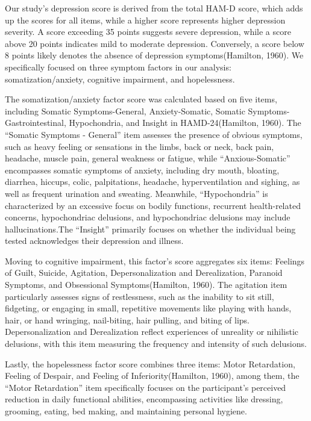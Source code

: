 \documentclass[
  man,floatsintext]{apa6}
\begin{document}
Our study's depression score is derived from the total HAM-D score, which adds up the scores for all items, while a higher score represents higher depression severity. A score exceeding 35 points suggests severe depression, while a score above 20 points indicates mild to moderate depression. Conversely, a score below 8 points likely denotes the absence of depression symptoms(Hamilton, 1960). We specifically focused on three symptom factors in our analysis: somatization/anxiety, cognitive impairment, and hopelessness.

The somatization/anxiety factor score was calculated based on five items, including Somatic Symptoms-General, Anxiety-Somatic, Somatic Symptoms-Gastrointestinal, Hypochondria, and Insight in HAMD-24(Hamilton, 1960). The ``Somatic Symptoms - General'' item assesses the presence of obvious symptoms, such as heavy feeling or sensations in the limbs, back or neck, back pain, headache, muscle pain, general weakness or fatigue, while ``Anxious-Somatic'' encompasses somatic symptoms of anxiety, including dry mouth, bloating, diarrhea, hiccups, colic, palpitations, headache, hyperventilation and sighing, as well as frequent urination and sweating. Meanwhile, ``Hypochondria'' is characterized by an excessive focus on bodily functions, recurrent health-related concerns, hypochondriac delusions, and hypochondriac delusions may include hallucinations.The ``Insight'' primarily focuses on whether the individual being tested acknowledges their depression and illness.

Moving to cognitive impairment, this factor's score aggregates six items: Feelings of Guilt, Suicide, Agitation, Depersonalization and Derealization, Paranoid Symptoms, and Obsessional Symptoms(Hamilton, 1960). The agitation item particularly assesses signs of restlessness, such as the inability to sit still, fidgeting, or engaging in small, repetitive movements like playing with hands, hair, or hand wringing, nail-biting, hair pulling, and biting of lips. Depersonalization and Derealization reflect experiences of unreality or nihilistic delusions, with this item measuring the frequency and intensity of such delusions.

Lastly, the hopelessness factor score combines three items: Motor Retardation, Feeling of Despair, and Feeling of Inferiority(Hamilton, 1960), among them, the ``Motor Retardation'' item specifically focuses on the participant's perceived reduction in daily functional abilities, encompassing activities like dressing, grooming, eating, bed making, and maintaining personal hygiene.
\end{document}
